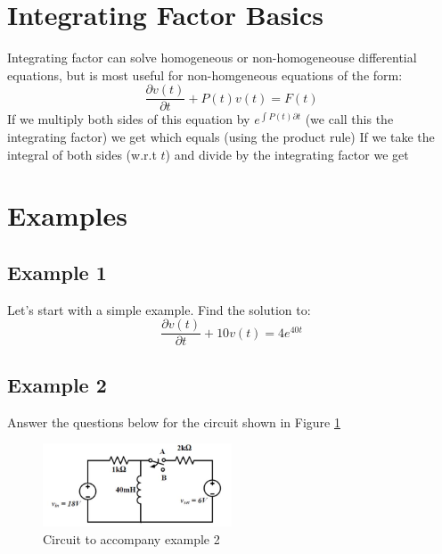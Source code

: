 \documentclass{handout}
\theoremstyle{definition}
\begin{document}
\section{Integrating Factor Basics}
Integrating factor can solve homogeneous or non-homogeneouse differential equations, but is most useful for non-homgeneous equations of the form:
\[
\frac{\partial v(t)}{\partial t} + P(t)v(t) = F(t)
\]
If we multiply both sides of this equation by $e^{\int P(t) \partial t}$ (we call this the integrating factor) we get
\soln{0.75in}{
\[
e^{\int P(t) \partial t}\frac{\partial v(t)}{\partial t} + e^{\int P(t) \partial t}P(t)v(t) = F(t)e^{\int P(t) \partial t}
\]
}
which equals (using the product rule)
\soln{0.75in}{
\[
\frac{\partial}{\partial t}\left[ e^{\int P(t) \partial t}v(t) \right]= F(t)e^{\int P(t) \partial t}
\]
}
If we take the integral of both sides (w.r.t $t$) and divide by the integrating factor we get
\soln{0.75in}{
\[
v(t) = \frac{\int F(t)e^{\int P(t) \partial t}\partial t}{e^{\int P(t) \partial t}}
\]
}

\newpage
\clearpage
\pagebreak

\section{Examples}
\subsection{Example 1}
Let's start with a simple example.  Find the solution to:
\[
\frac{\partial v(t)}{\partial t} + 10v(t) = 4e^{40t}
\]


\newpage
\clearpage
\pagebreak

\subsection{Example 2}
Answer the questions below for the circuit shown in Figure \ref{fig: Example2}
\begin{figure} [h!]
\centering
\includegraphics[width=0.5\textwidth]{Example2.jpg}
\caption{Circuit to accompany example 2}
\label{fig: Example2}
\end{figure}
\end{document}
